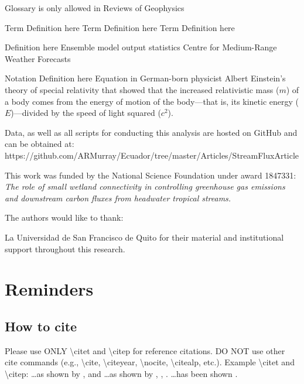 \documentclass[draft,linenumbers]{agujournal2018}
\begin{document}
Glossary is only allowed in Reviews of Geophysics

\begin{glossary}
 Term Definition here
 Term Definition here
 Term Definition here
\end{glossary}

\begin{acronyms}
 Definition here
 Ensemble model output statistics
 Centre for Medium-Range Weather Forecasts
\end{acronyms}

\begin{notation}
 Notation Definition here
Equation in German-born physicist Albert Einstein's theory of special
relativity that showed that the increased relativistic mass ($m$) of a
body comes from the energy of motion of the body—that is, its kinetic
energy ($E$)—divided by the speed of light squared ($c^2$).
\end{notation}

\acknowledgments

Data, as well as all scripts for conducting this analysis are hosted on
GitHub and can be obtained at:
https://github.com/ARMurray/Ecuador/tree/master/Articles/StreamFluxArticle

This work was funded by the National Science Foundation under award
1847331: \emph{The role of small wetland connectivity in controlling
greenhouse gas emissions and downstream carbon fluxes from headwater
tropical streams.}

The authors would like to thank:

La Universidad de San Francisco de Quito for their material and
institutional support throughout this research.

\section{Reminders}

\subsection{How to cite}

Please use ONLY \textbackslash{}citet and \textbackslash{}citep for
reference citations. DO NOT use other cite commands (e.g.,
\textbackslash{}cite, \textbackslash{}citeyear, \textbackslash{}nocite,
\textbackslash{}citealp, etc.). Example \textbackslash{}citet and
\textbackslash{}citep: \ldots{}as shown by \citet{Levitus2012},
\citet{Nuncio2011} and \citet{Raphael2004} \ldots{}as shown by
\citep{Levitus2012}, \citep{Nuncio2011}, \citep{Raphael2004}.
\ldots{}has been shown
\citep[e.g.,][]{Levitus2012, Nuncio2011, Raphael2004}.


\end{document}
